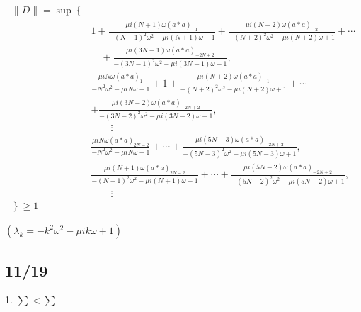 \documentclass[11pt,a4paper,titlepage]{jsreport}
\theoremstyle{definition}
\begin{document}
\begin{equation}
  \begin{split}
    \| D \| =
    \sup \left\lbrace \right. &\\
      &1 + \frac{\mu i (N+1) \omega (a*a)_{-1} }{-(N+1)^2 \omega^2 - \mu i (N+1) \omega +1} + \frac{ \mu i (N+2) \omega (a*a)_{-2} }{-(N+2)^2 \omega^2 - \mu i (N+2)\omega + 1} + \cdots  \\ & \quad + \frac{ \mu i (3N-1) \omega (a*a)_{-2N+2} }{-(3N-1)^2 \omega^2 - \mu i (3N-1)\omega + 1 }, \\
      &\frac{\mu i N \omega (a*a)_{1} }{-N^2 \omega^2 - \mu i N \omega +1} + 1 + \frac{\mu i (N+2) \omega (a*a)_{-1} }{-(N+2)^2 \omega^2 - \mu i (N+2) \omega +1} + \cdots \\ & + \frac{ \mu i (3N-2) \omega (a*a)_{-2N+2} }{-(3N-2)^2 \omega^2 - \mu i (3N-2)\omega + 1 }, \\
      & \qquad \vdots \\
      &\frac{\mu i N \omega (a*a)_{2N-2} }{-N^2 \omega^2 - \mu i N \omega +1} + \cdots + \frac{ \mu i (5N-3) \omega (a*a)_{-2N+2} }{-(5N-3)^2 \omega^2 - \mu i (5N-3)\omega + 1 }, \\
      &\frac{\mu i (N+1) \omega (a*a)_{2N-2} }{-(N+1)^2 \omega^2 - \mu i (N+1) \omega +1} + \cdots + \frac{ \mu i (5N-2) \omega (a*a)_{-2N+2} }{-(5N-2)^2 \omega^2 - \mu i (5N-2)\omega + 1 }, \\
      & \qquad \vdots \\
    \left. \right\rbrace \geq 1 &
  \end{split}
\end{equation}


$(\lambda_k = -k^2 \omega^2 - \mu i k \omega + 1)$

\subsection*{11/19}
1. $\sum < \sum$
\end{document}
